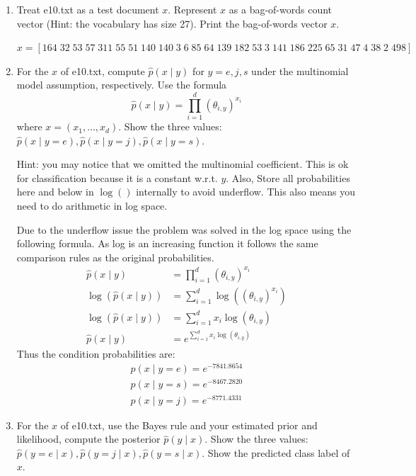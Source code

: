 \documentclass[a4paper]{article}
\theoremstyle{definition}
\newenvironment{soln}{
    \leavevmode\color{blue}\ignorespaces
}{}
\begin{document}
\begin{enumerate}
\item
Treat e10.txt as a test document $x$.
Represent $x$ as a bag-of-words count vector (Hint: the vocabulary has size 27).
Print the bag-of-words vector $x$.

\begin{soln}
        $x = [164\;32\;53\;57\;311\;55\;51\;140\;140\;3\;6\;85\;64\;139\;182\;53\;3\;141\;186\;225\;65\;31\;47\;4\;38\;2\;498]$
\end{soln}

\item
For the $x$ of e10.txt, compute $\hat p(x \mid y)$ for $y=e, j, s$ under the multinomial model assumption, respectively.
Use the formula
$$\hat p(x \mid y) = \prod_{i=1}^d (\theta_{i, y})^{x_i}$$
where $x=(x_1, \ldots, x_d)$.
Show the three values: $\hat p(x \mid y=e), \hat p(x \mid y=j), \hat p(x \mid y=s)$.

Hint: you may notice that we omitted the multinomial coefficient.  This is ok for classification because it is a constant w.r.t. $y$. Also, Store all probabilities here and below in $\log()$ internally to avoid underflow. This also means you need to do arithmetic in log space. 

\begin{soln}
    Due to the underflow issue the problem was solved in the log space using the following formula. As log is an increasing function it follows the same comparison rules as the original probabilities.
    \begin{align*}
        \hat p(x \mid y) &= \prod_{i=1}^d (\theta_{i, y})^{x_i}\\
        \log(\hat p(x \mid y)) &= \sum_{i=1}^d\log((\theta_{i, y})^{x_i})\\
        \log(\hat p(x \mid y)) &= \sum_{i=1}^d x_i\log(\theta_{i, y})\\
        \hat p(x \mid y) &= e^{\sum_{i=1}^d x_i\log(\theta_{i, y})}
    \end{align*}
    Thus the condition probabilities are:
    \begin{gather*}
        \hat p(x \mid y=e) = e^{-7841.8654}\\
        \hat p(x \mid y=s) = e^{-8467.2820}\\
        \hat p(x \mid y=j) = e^{-8771.4331}
    \end{gather*}
\end{soln}

\item
For the $x$ of e10.txt, use the Bayes rule and your estimated prior and likelihood, compute the posterior $\hat p(y \mid x)$.
Show the three values: $\hat p(y=e \mid x), \hat p(y=j \mid x), \hat p(y=s \mid x)$.
Show the predicted class label of $x$.


\end{enumerate}
\end{document}
